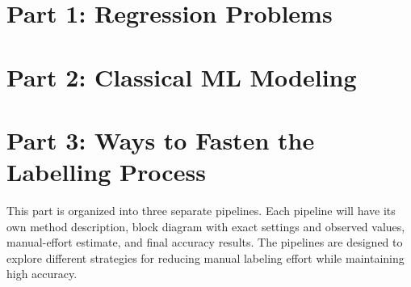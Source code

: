 
\newpage

\section{Part 1: Regression Problems}

\newpage

\newpage

\section{Part 2: Classical ML Modeling}

\newpage

\section{Part 3: Ways to Fasten the Labelling Process}
This part is organized into three separate pipelines. Each pipeline will have its own method description, block diagram with exact settings and observed values, manual-effort estimate, and final accuracy results. The pipelines are designed to explore different strategies for reducing manual labeling effort while maintaining high accuracy.

\newpage

\newpage

\newpage
